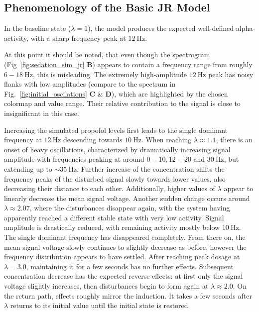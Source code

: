 \newtoggle{drawLocRoc}

\toggletrue{drawLocRoc}
\def\simRunName{JR_LONGER_INIT}
\def\locStart{1.1}
\def\locST{6.61}
\def\locEnd{2.07}
\def\locET{18.89}
\def\rocStart{2.0}
\def\rocST{48.63}
\def\rocEnd{1.00}
\def\rocET{62.0}
\subsection{Phenomenology of the Basic JR Model}
    In the baseline state ($\lambda = 1$), the model produces the expected well-defined alpha-activity,
    with a sharp frequency peak at $\SI{12}{\hertz}$.
\begin{remark}
    At this point it should be noted,
    that even though the spectrogram (Fig~\ref{fig:sedation_sim_jr} \textbf{B}) appears to contain a frequency range
    from roughly $6-18\SI{}{\hertz}$,
    this is misleading.
    The extremely high-amplitude $\SI{12}{\hertz}$ peak has noisy flanks with low amplitudes
    (compare to the spectrum in Fig.~\ref{fig:initial_oscilations} \textbf{C} \& \textbf{D}),
    which are highlighted by the chosen colormap and value range.
    Their relative contribution to the signal is close to insignificant in this case.
\end{remark}
    Increasing the simulated propofol levels first leads to the single dominant frequency at $\SI{12}{\hertz} $
    descending towards $\SI{10}{\hertz} $.
    When reaching $\lambda \approx \locStart $,
    there is an onset of heavy oscillations, characterized by dramatically increasing signal amplitude
    with frequencies peaking at around $0-10, 12-20$ and $ \SI{30}{\hertz} $,
    but extending up to $\sim \SI{35}{\hertz} $.
    Further increase of the concentration shifts the frequency peaks of the disturbed signal slowly towards lower
    values, also decreasing their distance to each other.
    Additionally, higher values of $\lambda$ appear to linearly decrease the mean signal voltage.
    Another sudden change occurs around $\lambda \approx \locEnd $,
    where the disturbances disappear again,
    with the system having apparently reached a different stable state with very low activity.
    Signal amplitude is drastically reduced, with remaining activity mostly below $\SI{10}{\hertz}$.
    The single dominant frequency has disappeared completely.
    From there on, the mean signal voltage slowly continues to slightly decrease as before,
    however the frequency distribution appears to have settled.
    After reaching peak dosage at $\lambda = 3.0$, maintaining it for a few seconds has no further effects.
    Subsequent concentration decrease has the expected reverse effects:
    at first only the signal voltage slightly increases,
    then disturbances begin to form again at $\lambda \approx \rocStart$.
    On the return path, effects roughly mirror the induction.
    It takes a few seconds after $\lambda$ returns to its initial value until the initial state is restored.

